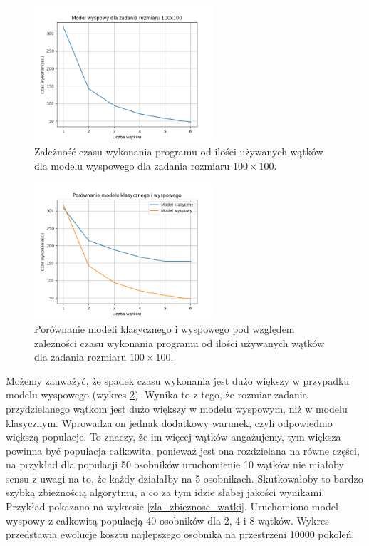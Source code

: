 \begin{figure}[H]
    \centering        
    \includegraphics[width=0.6\textwidth]{img/plot_island_threads_100x100.png}
    \caption{Zależność czasu wykonania programu od ilości używanych wątków dla modelu wyspowego dla zadania rozmiaru $100\times100$.}
    \label{threads_island_100x100}
\end{figure}

\begin{figure}[H]
    \centering        
    \includegraphics[width=0.6\textwidth]{img/plot_compare_threads_100x100.png}
    \caption{Porównanie modeli klasycznego i wyspowego pod względem zależności czasu wykonania programu od ilości używanych wątków dla zadania 
    rozmiaru $100\times100$.}
    \label{threads_comparsion_100x100}
\end{figure}

Możemy zauważyć, że spadek czasu wykonania jest dużo większy w przypadku modelu wyspowego (wykres \ref{threads_comparsion_100x100}). 
Wynika to z tego, że rozmiar zadania przydzielanego wątkom 
jest dużo większy w modelu wyspowym, niż w modelu klasycznym. Wprowadza on jednak dodatkowy warunek, czyli odpowiednio większą populacje. To znaczy, że 
im więcej wątków angażujemy, tym większa powinna być populacja całkowita, ponieważ jest ona rozdzielana na równe części, na przykład dla populacji 50 
osobników uruchomienie 10 wątków nie miałoby sensu z uwagi na to, że każdy działałby na 5 osobnikach. Skutkowałoby to bardzo szybką zbieżnością algorytmu, 
a co za tym idzie słabej jakości wynikami. Przykład pokazano na wykresie \ref{zla_zbieznosc_watki}. Uruchomiono model wyspowy z całkowitą populacją 40 osobników 
dla 2, 4 i 8 wątków. Wykres przedstawia ewolucje kosztu najlepszego osobnika na przestrzeni 10000 pokoleń.


